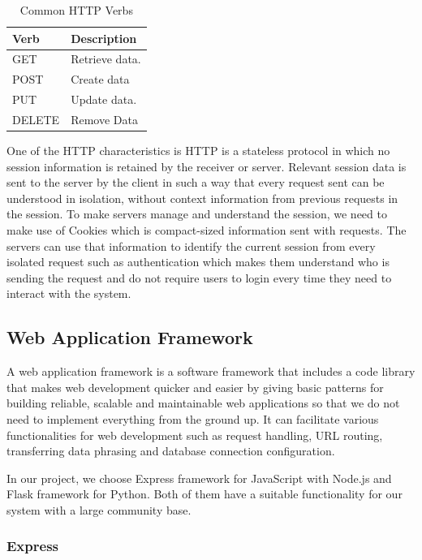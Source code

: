 \documentclass[12pt,oneside,openright,a4paper]{cpe-english-project}
\begin{document}
\begin{table}[H]
\caption{Common HTTP Verbs}\label{tbl:2CommonHTTPVerbs}
\begin{tabularx}{\textwidth}{l|l} \hline\hline
Verb & Description \\ \hline\hline
GET & Retrieve data. \\ \hline
POST & Create data \\ \hline
PUT & Update data. \\ \hline
DELETE & Remove Data \\ \hline\hline
\end{tabularx}
\end{table}

One of the HTTP characteristics is HTTP is a stateless protocol in which no session information is retained by the receiver or server. Relevant session data is sent to the server by the client in such a way that every request sent can be understood in isolation, without context information from previous requests in the session. \cite{Statelessprotocol} To make servers manage and understand the session, we need to make use of Cookies which is compact-sized information sent with requests. The servers can use that information to identify the current session from every isolated request such as authentication which makes them understand who is sending the request and do not require users to login every time they need to interact with the system.


\subsection{Web Application Framework}

A web application framework is a software framework that includes a code library that makes web development quicker and easier by giving basic patterns for building reliable, scalable and maintainable web applications \cite{WhatIsWebFramework} so that we do not need to implement everything from the ground up. It can facilitate various functionalities for web development such as request handling, URL routing, transferring data phrasing and database connection configuration.

In our project, we choose Express framework for JavaScript with Node.js and Flask framework for Python. Both of them have a suitable functionality for our system with a large community base.

\subsubsection{Express}
\end{document}
